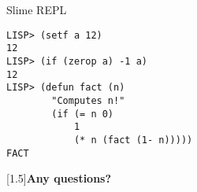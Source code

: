 \documentclass[aspectratio=169]{beamer}
\begin{document}
\begin{frame}[fragile]
  \begin{popup}{.75}
    \begin{macosdarkdialog}{Slime REPL}
      \begin{verbatim}
LISP> (setf a 12)
12
LISP> (if (zerop a) -1 a)
12
LISP> (defun fact (n)
        "Computes n!"
        (if (= n 0)
            1
            (* n (fact (1- n)))))
FACT
      \end{verbatim}
    \end{macosdarkdialog}
  \end{popup}
\end{frame}

\begin{standoutframe}
  \begin{center}
    \scalebox{1.5}[1.5]{\Huge \bfseries Any questions?}
  \end{center}
\end{standoutframe}


%   
%   





\end{document}
